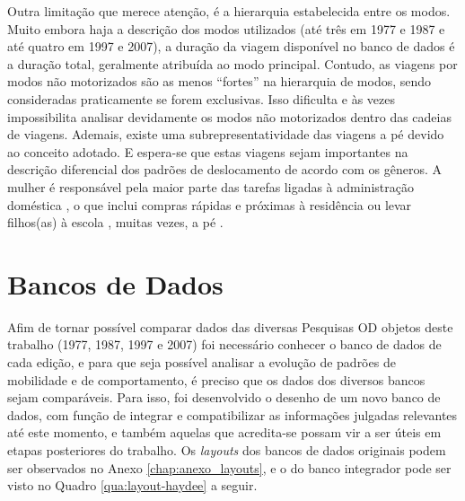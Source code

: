 Outra limitação que merece atenção, é a hierarquia estabelecida entre os modos. Muito embora haja a descrição dos modos utilizados (até três em 1977 e 1987 e até quatro em 1997 e 2007), a duração da viagem disponível no banco de dados é a duração total, geralmente atribuída ao modo principal. Contudo, as viagens por modos não motorizados são as menos ``fortes'' na hierarquia de modos, sendo consideradas praticamente se forem exclusivas. Isso dificulta e às vezes impossibilita analisar devidamente os modos não motorizados dentro das cadeias de viagens. 
Ademais, existe uma subrepresentatividade das viagens a pé devido ao conceito adotado. E espera-se que estas viagens sejam importantes na descrição diferencial dos padrões de deslocamento de acordo com os gêneros. A mulher é responsável pela maior parte das tarefas ligadas à administração doméstica \cite{ROOT1999,VANCE2007}, o que inclui compras rápidas e próximas à residência ou levar filhos(as) à escola \cite{FOX1983,FAGNANI1983,IBIPO1992,MCNUCKIN2005,SCHWANEN2002,SONG2003,CRANE2007}, muitas vezes, a pé \cite{VASCONCELLOS2001}.

\clearpage
\section{Bancos de Dados}\label{sec:bd}

Afim de tornar possível comparar dados das diversas Pesquisas OD objetos deste trabalho (1977, 1987, 1997 e 2007) foi necessário conhecer o banco de dados de cada edição, e para que seja possível analisar a evolução de padrões de mobilidade e de comportamento, é preciso que os dados dos diversos bancos sejam comparáveis. Para isso, foi desenvolvido o desenho de um novo banco de dados, com função de integrar e compatibilizar as informações julgadas relevantes até este momento, e também aquelas que acredita-se possam vir a ser úteis em etapas posteriores do trabalho. Os \emph{layouts} dos bancos de dados originais podem ser observados no Anexo \ref{chap:anexo_layouts}, e o do banco integrador pode ser visto no Quadro \ref{qua:layout-haydee} a seguir.

